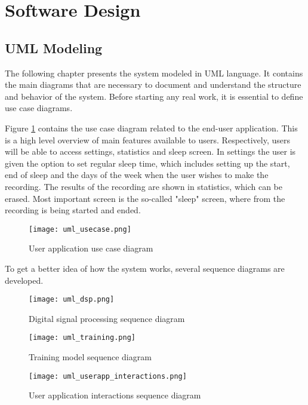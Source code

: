 \section{Software Design}\label{sec:design}

\subsection{UML Modeling}
The following chapter presents the system modeled in UML language. It contains the main diagrams that are necessary to document and understand the structure and behavior of the system. Before starting any real work, it is essential to define use case diagrams. 

Figure \ref{fig:umlusecase} contains the use case diagram related to the end-user application. This is a high level overview of main features available to users. Respectively, users will be able to access settings, statistics and sleep screen. In settings the user is given the option to set regular sleep time, which includes setting up the start, end of sleep and the days of the week when the user wishes to make the recording. The results of the recording are shown in statistics, which can be erased. Most important screen is the so-called "sleep" screen, where from the recording is being started and ended.

\begin{figure}[!ht]
\centering
  \texttt{[image: uml\_usecase.png]}
\caption{User application use case diagram}
\label{fig:umlusecase}
\end{figure}

To get a better idea of how the system works, several sequence diagrams are developed. 

\begin{figure}[!ht]
\centering
  \texttt{[image: uml\_dsp.png]}
\caption{Digital signal processing sequence diagram}
\label{fig:umldsp}
\end{figure}

\begin{figure}[!ht]
\centering
  \texttt{[image: uml\_training.png]}
\caption{Training model sequence diagram}
\label{fig:umltraining}
\end{figure}

\begin{figure}[!ht]
\centering
  \texttt{[image: uml\_userapp\_interactions.png]}
\caption{User application interactions sequence diagram}
\label{fig:umluserapp}
\end{figure}

